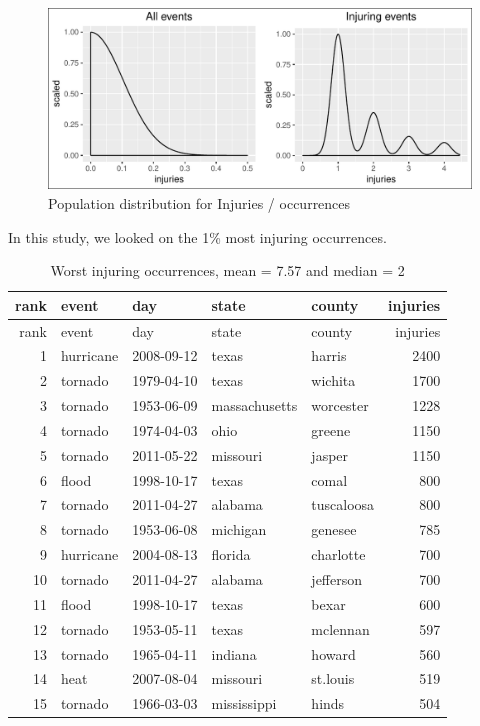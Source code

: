 \documentclass[]{article}
\begin{document}
\begin{figure}[htbp]
\centering
\includegraphics{readme_files/figure-latex/inj-distribution-1.pdf}
\caption{Population distribution for Injuries / occurrences}
\end{figure}

In this study, we looked on the 1\% most injuring occurrences.

\begin{longtable}[]{@{}rllllr@{}}
\caption{Worst injuring occurrences, mean = 7.57 and median =
2}\tabularnewline
\toprule
rank & event & day & state & county & injuries\tabularnewline
\midrule
\endfirsthead
\toprule
rank & event & day & state & county & injuries\tabularnewline
\midrule
\endhead
1 & hurricane & 2008-09-12 & texas & harris & 2400\tabularnewline
2 & tornado & 1979-04-10 & texas & wichita & 1700\tabularnewline
3 & tornado & 1953-06-09 & massachusetts & worcester &
1228\tabularnewline
4 & tornado & 1974-04-03 & ohio & greene & 1150\tabularnewline
5 & tornado & 2011-05-22 & missouri & jasper & 1150\tabularnewline
6 & flood & 1998-10-17 & texas & comal & 800\tabularnewline
7 & tornado & 2011-04-27 & alabama & tuscaloosa & 800\tabularnewline
8 & tornado & 1953-06-08 & michigan & genesee & 785\tabularnewline
9 & hurricane & 2004-08-13 & florida & charlotte & 700\tabularnewline
10 & tornado & 2011-04-27 & alabama & jefferson & 700\tabularnewline
11 & flood & 1998-10-17 & texas & bexar & 600\tabularnewline
12 & tornado & 1953-05-11 & texas & mclennan & 597\tabularnewline
13 & tornado & 1965-04-11 & indiana & howard & 560\tabularnewline
14 & heat & 2007-08-04 & missouri & st.louis & 519\tabularnewline
15 & tornado & 1966-03-03 & mississippi & hinds & 504\tabularnewline
\bottomrule
\end{longtable}
\end{document}
